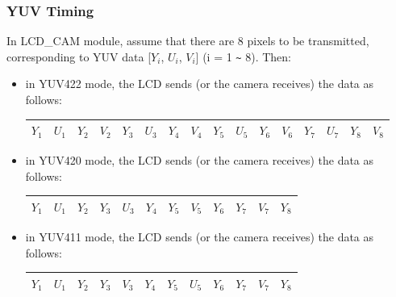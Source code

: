 \documentclass[main\_\_EN.tex]{subfiles}
\begin{document}
\subsubsection{YUV Timing}
In LCD\_CAM module, assume that there are 8 pixels to be transmitted, corresponding to YUV data [$Y_i$, $U_i$, $V_i$] (i = 1 \verb+~+ 8). Then:
\begin{itemize}
    \item in YUV422 mode, the LCD sends (or the camera receives) the data as follows:
        \begin{table}[H]
            \centering
            \begin{tabular}{|c|c|c|c|c|c|c|c|c|c|c|c|c|c|c|c|}
            \hline
            $Y_1$ & $U_1$ & $Y_2$ & $V_2$ & $Y_3$ & $U_3$ & $Y_4$ & $V_4$ & $Y_5$ & $U_5$ & $Y_6$ & $V_6$ & $Y_7$ & $U_7$ & $Y_8$ & $V_8$ \\ \hline
            \end{tabular}
        \end{table}
    \item in YUV420 mode, the LCD sends (or the camera receives) the data as follows:
        \begin{table}[H]
            \centering
            \begin{tabular}{|c|c|c|c|c|c|c|c|c|c|c|c|}
            \hline
            $Y_1$ & $U_1$ & $Y_2$ & $Y_3$ & $U_3$ & $Y_4$ & $Y_5$ & $V_5$ & $Y_6$ & $Y_7$ & $V_7$ & $Y_8$ \\ \hline
            \end{tabular}
        \end{table}
    \item in YUV411 mode, the LCD sends (or the camera receives) the data as follows:
        \begin{table}[H]
            \centering
            \begin{tabular}{|c|c|c|c|c|c|c|c|c|c|c|c|}
            \hline
            $Y_1$ & $U_1$ & $Y_2$ & $Y_3$ & $V_3$ & $Y_4$ & $Y_5$ & $U_5$ & $Y_6$ & $Y_7$ & $V_7$ & $Y_8$ \\ \hline
            \end{tabular}
        \end{table}
\end{itemize}
\end{document}
